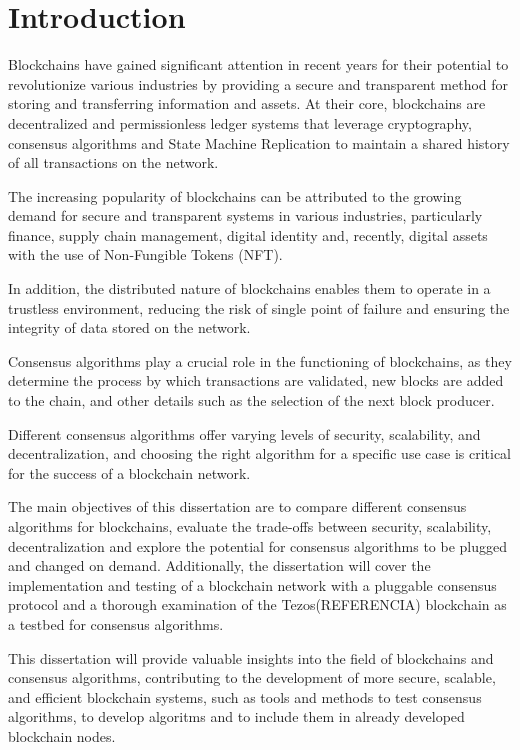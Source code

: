 \chapter{Introduction}
\label{chap:int}


Blockchains have gained significant attention in recent years for their potential to revolutionize various industries by providing a secure and transparent method for storing and transferring information and assets.
At their core, blockchains are decentralized and permissionless ledger systems that leverage cryptography, consensus algorithms and State Machine Replication to maintain a shared history of all transactions on the network.

The increasing popularity of blockchains can be attributed to the growing demand for secure and transparent systems in various industries, particularly finance, supply chain management, digital identity and, recently, digital assets with the use of Non-Fungible Tokens (NFT).

In addition, the distributed nature of blockchains enables them to operate in a trustless environment, reducing the risk of single point of failure and ensuring the integrity of data stored on the network.

Consensus algorithms play a crucial role in the functioning of blockchains, as they determine the process by which transactions are validated, new blocks are added to the chain, and other details such as the selection of the next block producer.

Different consensus algorithms offer varying levels of security, scalability, and decentralization, and choosing the right algorithm for a specific use case is critical for the success of a blockchain network.

The main objectives of this dissertation are to compare different consensus algorithms for blockchains,
evaluate the trade-offs between security, scalability, decentralization and explore the potential for consensus algorithms to be plugged and changed on demand.
Additionally, the dissertation will cover the implementation and testing of a blockchain network with a pluggable consensus protocol and a thorough examination of the Tezos(REFERENCIA) blockchain as a testbed for consensus algorithms.

This dissertation will provide valuable insights into the field of blockchains and consensus algorithms, contributing to the development of more secure, scalable, and efficient blockchain systems, such as tools and methods to test consensus algorithms, to develop algoritms and to include them in already developed blockchain nodes.

